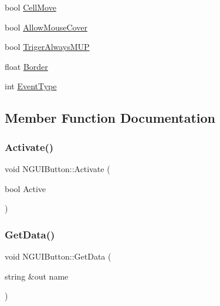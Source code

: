 \begin{DoxyCompactItemize}
\item 
bool \hyperlink{class_n_g_u_i_button_a18a5c253345f244aadee35979e45e174}{Cell\+Move}
\item 
bool \hyperlink{class_n_g_u_i_button_a7b45b9acace197bc5be17bee98d93056}{Allow\+Mouse\+Cover}
\item 
bool \hyperlink{class_n_g_u_i_button_abc0ad209eb7b9ed4991fdb2af6620297}{Triger\+Always\+M\+UP}
\item 
float \hyperlink{class_n_g_u_i_button_a98001105905d70f5212a73e984c03b0f}{Border}
\item 
int \hyperlink{class_n_g_u_i_button_ae70e78ae04fe7db80093cac83687e7a6}{Event\+Type}
\end{DoxyCompactItemize}


\subsection{Member Function Documentation}
\hypertarget{class_n_g_u_i_button_af5f7bad04357746cb82281fce3215eaa}{}\label{class_n_g_u_i_button_af5f7bad04357746cb82281fce3215eaa} 
\subsubsection{\texorpdfstring{Activate()}{Activate()}}
{\footnotesize\ttfamily void N\+G\+U\+I\+Button\+::\+Activate (\begin{DoxyParamCaption}\item[{bool}]{Active }\end{DoxyParamCaption})}

\hypertarget{class_n_g_u_i_button_a06a8262af7a79c5e38310c601c2cb5ab}{}\label{class_n_g_u_i_button_a06a8262af7a79c5e38310c601c2cb5ab} 
\subsubsection{\texorpdfstring{Get\+Data()}{GetData()}}
{\footnotesize\ttfamily void N\+G\+U\+I\+Button\+::\+Get\+Data (\begin{DoxyParamCaption}\item[{string \&out}]{name }\end{DoxyParamCaption})}

\hypertarget{class_n_g_u_i_button_abafe0c6a13bf64a2dfda16ec804881cd}{}\label{class_n_g_u_i_button_abafe0c6a13bf64a2dfda16ec804881cd} 
